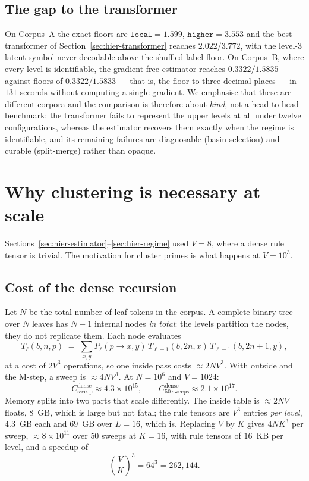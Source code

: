 \documentclass[11pt,a4paper]{article}
\theoremstyle{plain}
\theoremstyle{definition}
\begin{document}
\subsection{The gap to the transformer}

On Corpus~A the exact floors are $\texttt{local}=1.599$, $\texttt{higher}=3.553$
and the best transformer of Section~\ref{sec:hier-transformer} reaches
$2.022/3.772$, with the level-3 latent symbol never decodable above the
shuffled-label floor. On Corpus~B, where every level is identifiable, the
gradient-free estimator reaches $0.3322/1.5835$ against floors of
$0.3322/1.5833$ --- that is, the floor to three decimal places --- in $131$
seconds without computing a single gradient. We emphasise that these are
different corpora and the comparison is therefore about \emph{kind}, not a
head-to-head benchmark: the transformer fails to represent the upper levels at
all under twelve configurations, whereas the estimator recovers them exactly
when the regime is identifiable, and its remaining failures are diagnosable
(basin selection) and curable (split-merge) rather than opaque.


\section{Why clustering is necessary at scale}
\label{sec:hier-scaling}

Sections~\ref{sec:hier-estimator}--\ref{sec:hier-regime} used $V=8$, where a
dense rule tensor is trivial. The motivation for cluster primes is what happens
at $V=10^3$.

\subsection{Cost of the dense recursion}

Let $N$ be the total number of leaf tokens in the corpus. A complete binary
tree over $N$ leaves has $N-1$ internal nodes \emph{in total}: the levels
partition the nodes, they do not replicate them. Each node evaluates
\begin{equation}
  T_\ell(b,n,p) \;=\; \sum_{x,y} P_\ell(p\to x,y)\,
  T_{\ell-1}(b,2n,x)\, T_{\ell-1}(b,2n{+}1,y),
  \label{eq:inside-cost}
\end{equation}
at a cost of $2V^3$ operations, so one inside pass costs $\approx 2NV^3$. With
outside and the M-step, a sweep is $\approx 4NV^3$. At $N=10^6$ and $V=1024$:
\begin{equation}
  C^{\text{dense}}_{\text{sweep}} \approx 4.3\times 10^{15},
  \qquad
  C^{\text{dense}}_{50\ \text{sweeps}} \approx 2.1\times 10^{17}.
\end{equation}
Memory splits into two parts that scale differently. The inside table is
$\approx 2NV$ floats, $8$~GB, which is large but not fatal; the rule tensors
are $V^3$ entries \emph{per level}, $4.3$~GB each and $69$~GB over $L=16$,
which is. Replacing $V$ by $K$ gives $4NK^3$ per sweep,
$\approx 8\times10^{11}$ over $50$ sweeps at $K=16$, with rule tensors of
$16$~KB per level, and a speedup of
\begin{equation}
  \left(\frac{V}{K}\right)^{3} = 64^3 = 262{,}144.
\end{equation}
\end{document}
